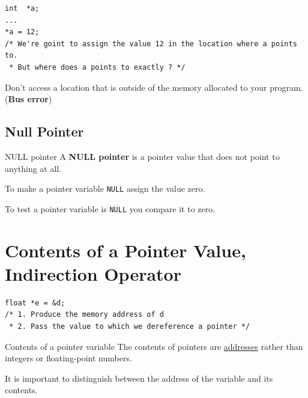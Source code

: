 \begin{lstlisting}
int  *a; 
... 
*a = 12; 
/* We're goint to assign the value 12 in the location where a points to. 
 * But where does a points to exactly ? */
\end{lstlisting}

Don't access a location that is outside of the memory allocated to your program. (\textbf{Bus error})

\subsection{Null Pointer} %
\label{sub:Null Pointer}

\begin{Definition}[colbacktitle=red!75!black]{NULL pointer}{}
A \textbf{NULL pointer} is a pointer value that does not point to anything at all.
\end{Definition}

To make a pointer variable \verb|NULL| assign the value zero. 

To test a pointer variable is \verb|NULL| you compare it to zero.




\section{Contents of a Pointer Value, Indirection Operator} %
\label{sec:Contents of a Pointer Value}





\begin{lstlisting}
float *e = &d;  
/* 1. Produce the memory address of d 
 * 2. Pass the value to which we dereference a pointer */ 
\end{lstlisting}

\begin{Prop}{Contents of a pointer variable}{}
The contents of pointers are \underline{addresses}  rather than integers or floating-point numbers. 

It is important to distinguish between the address of the variable and its contents.
\end{Prop}

